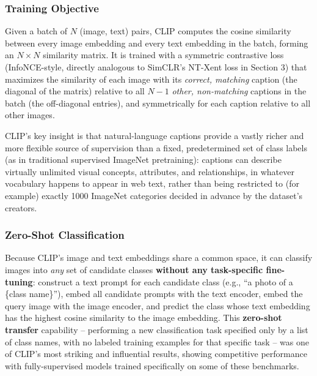 \documentclass[12pt,a4paper]{article}
\begin{document}
\subsubsection{Training Objective}

\begin{defbox}
Given a batch of $N$ (image, text) pairs, CLIP computes the cosine similarity between every image embedding and every text embedding in the batch, forming an $N\times N$ similarity matrix. It is trained with a symmetric contrastive loss (InfoNCE-style, directly analogous to SimCLR's NT-Xent loss in Section 3) that maximizes the similarity of each image with its \emph{correct, matching} caption (the diagonal of the matrix) relative to all $N-1$ \emph{other, non-matching} captions in the batch (the off-diagonal entries), and symmetrically for each caption relative to all other images.
\end{defbox}

\begin{keyidea}
CLIP's key insight is that natural-language captions provide a vastly richer and more flexible source of supervision than a fixed, predetermined set of class labels (as in traditional supervised ImageNet pretraining): captions can describe virtually unlimited visual concepts, attributes, and relationships, in whatever vocabulary happens to appear in web text, rather than being restricted to (for example) exactly 1000 ImageNet categories decided in advance by the dataset's creators.
\end{keyidea}

\subsubsection{Zero-Shot Classification}

\begin{keyidea}
Because CLIP's image and text embeddings share a common space, it can classify images into \emph{any} set of candidate classes \textbf{without any task-specific fine-tuning}: construct a text prompt for each candidate class (e.g., ``a photo of a \{class name\}''), embed all candidate prompts with the text encoder, embed the query image with the image encoder, and predict the class whose text embedding has the highest cosine similarity to the image embedding. This \textbf{zero-shot transfer} capability -- performing a new classification task specified only by a list of class names, with no labeled training examples for that specific task -- was one of CLIP's most striking and influential results, showing competitive performance with fully-supervised models trained specifically on some of these benchmarks.
\end{keyidea}
\end{document}
